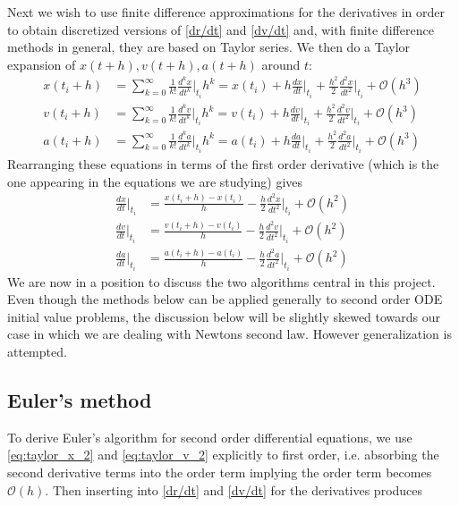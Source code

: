 \documentclass[12pt]{article}
\numberwithin{figure}{section}
\numberwithin{table}{section}
\begin{document}
\noindent Next we wish to use finite difference approximations for the derivatives in order to obtain discretized versions of \eqref{dr/dt} and \eqref{dv/dt} and, with finite difference methods in general, they are based on Taylor series. We then do a Taylor expansion of $x(t+h),v(t+h),a(t+h)$ around $t$:
\begin{align}
	x(t_i+h)&=\sum_{k=0}^{\infty}\frac{1}{k!}\frac{d^kx}{dt^k}\Bigr|_{t_i}h^k=x(t_i)+h\frac{dx}{dt}\Bigr|_{t_i}+\frac{h^2}{2}\frac{d^2x}{dt^2}\Bigr|_{t_i}+\mathcal{O}(h^3) \label{eq:taylor_x}\\[0.2cm]
	v(t_i+h)&=\sum_{k=0}^{\infty}\frac{1}{k!}\frac{d^kv}{dt^k}\Bigr|_{t_i}h^k=v(t_i)+h\frac{dv}{dt}\Bigr|_{t_i}+\frac{h^2}{2}\frac{d^2v}{dt^2}\Bigr|_{t_i}+\mathcal{O}(h^3) \label{eq:taylor_v}\\[0.2cm]
	a(t_i+h)&=\sum_{k=0}^{\infty}\frac{1}{k!}\frac{d^ka}{dt^k}\Bigr|_{t_i}h^k=a(t_i)+h\frac{da}{dt}\Bigr|_{t_i}+\frac{h^2}{2}\frac{d^2a}{dt^2}\Bigr|_{t_i}+\mathcal{O}(h^3) \label{eq:taylor_a}
\end{align}
Rearranging these equations in terms of the first order derivative (which is the one appearing in the equations we are studying) gives
\begin{align}
	\frac{dx}{dt}\Bigr|_{t_i}&=\frac{x(t_i+h)-x(t_i)}{h}-\frac{h}{2}\frac{d^2x}{dt^2}\Bigr|_{t_i}+\mathcal{O}(h^2) \label{eq:taylor_x_2}\\[0.2cm]
	\frac{dv}{dt}\Bigr|_{t_i}&=\frac{v(t_i+h)-v(t_i)}{h}-\frac{h}{2}\frac{d^2v}{dt^2}\Bigr|_{t_i}+\mathcal{O}(h^2) \label{eq:taylor_v_2}\\[0.2cm]
	\frac{da}{dt}\Bigr|_{t_i}&=\frac{a(t_i+h)-a(t_i)}{h}-\frac{h}{2}\frac{d^2a}{dt^2}\Bigr|_{t_i}+\mathcal{O}(h^2) \label{eq:taylor_a_2}
\end{align}
We are now in a position to discuss the two algorithms central in this project. Even though the methods below can be applied generally to second order ODE initial value problems, the discussion below will be slightly skewed towards our case in which we are dealing with Newtons second law. However generalization is attempted.




\subsection{Euler's method} \label{sec:euler}
To derive Euler's algorithm for second order differential equations, we use \eqref{eq:taylor_x_2} and \eqref{eq:taylor_v_2} explicitly to first order, i.e. absorbing the second derivative terms into the order term implying the order term becomes $\mathcal{O}(h)$. Then inserting into \eqref{dr/dt} and \eqref{dv/dt} for the derivatives produces
\end{document}
